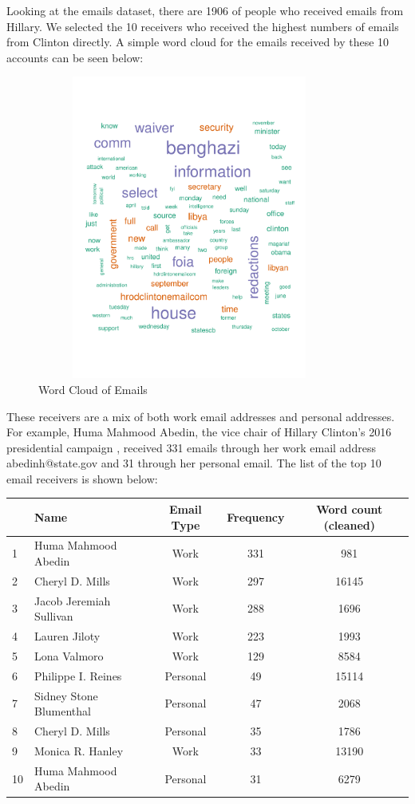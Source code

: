 Looking at the emails dataset, there are 1906 of people who received emails from Hillary. We selected the 10 receivers who received the highest numbers of emails from Clinton directly.
A simple word cloud for the emails received by these 10 accounts can be seen below:

\begin{figure}[h!]
    \centering
    \includegraphics[width=10cm,height=10cm]
    {daitong_and_yihe/wcloud.pdf}
    \caption{Word Cloud of Emails}
\end{figure}

These receivers are a mix of both work email addresses and personal addresses. For example, Huma Mahmood Abedin, the vice chair of Hillary Clinton's 2016 presidential campaign \cite{huma2016}, received 331 emails through her work email address abedinh@state.gov and 31 through her personal email. 
The list of the top 10 email receivers is shown below:
\begin{center}
  \begin{tabular}{ |l| l | c | c |c|}
    \hline
    &Name & Email Type & Frequency & Word count (cleaned)\\ \hline
    1&Huma Mahmood Abedin & Work & 331 & 981 \\ \hline
    2&Cheryl D. Mills & Work & 297 &16145 \\ \hline
    3&Jacob Jeremiah Sullivan & Work & 288 & 1696\\ \hline
    4&Lauren Jiloty & Work & 223 &1993\\ \hline
    5&Lona Valmoro & Work & 129 &8584\\ \hline
    6&Philippe I. Reines & Personal & 49 &15114\\ \hline
    7&Sidney Stone Blumenthal & Personal & 47 &2068\\ \hline
    8&Cheryl D. Mills & Personal & 35 &1786\\ \hline
    9&Monica R. Hanley & Work & 33 &13190\\ \hline
    10&Huma Mahmood Abedin & Personal & 31&6279 \\
    \hline
  \end{tabular}
\end{center}

